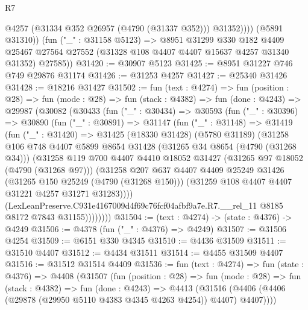 \begin{lexlean}{R7}
\begin{coremodule}
                @4257
                (@31334 @352 @26957 (@4790 (@31337 @352)))
                @31352))))
        (@5891 @31310))
      (fun ("_" : @31158 @5123) =>
      @8951
        @31299
        @330
        @182
        @4409
        @25467
        @27564
        @27552
        (@31328 @108 @4407 @4407 @15637 @4257 @31340 @31352)
        @27585))
@31420 := @30907 @5123
@31425 := @8951 @31227 @746 @749 @29876 @31174
@31426 := @31253 @4257
@31427 := @25340 @31426
@31428 := @18216 @31427
@31502 := fun (text : @4274) =>
  fun (position : @28) =>
  fun (mode : @28) =>
  fun (stack : @4382) =>
  fun (done : @4243) =>
  @29987
    (@30082
      (@30433
        (fun ("_" : @30434) =>
        @30593
          (fun ("_" : @30396) =>
          @30890
            (fun ("_" : @30891) =>
            @31147
              (fun ("_" : @31148) =>
              @31419
                (fun ("_" : @31420) =>
                @31425
                  (@18330 @31428)
                  (@5780 @31189)
                  (@31258
                    @106
                    @748
                    @4407
                    @5899
                    @8654
                    @31428
                    (@31265 @34 @8654 (@4790 (@31268 @34)))
                    (@31258
                      @119
                      @700
                      @4407
                      @4410
                      @18052
                      @31427
                      (@31265 @97 @18052 (@4790 (@31268 @97)))
                      (@31258
                        @207
                        @637
                        @4407
                        @4409
                        @25249
                        @31426
                        (@31265 @150 @25249 (@4790 (@31268 @150)))
                        (@31259 @108 @4407 @4407 @31221 @4257 @31271 @31283))))
                  (LexLeanPreserve.C931e4167009d4f69c76fcf04afbf9a7e.R7.__rel_11
                    @8185
                    @8172
                    @7843
                    @31155))))))))
@31504 := (text : @4274) -> (state : @4376) -> @4249
@31506 := @4378 (fun ("_" : @4376) => @4249)
@31507 := @31506 @4254
@31509 := @6151 @330 @4345
@31510 := @4436 @31509
@31511 := @31510 @4407
@31512 := @4434 @31511
@31514 := @4455 @31509 @4407
@31516 := @31512 @31514 @4409
@31536 := fun (text : @4274) =>
  fun (state : @4376) =>
  @4408
    (@31507
      (fun (position : @28) =>
      fun (mode : @28) =>
      fun (stack : @4382) =>
      fun (done : @4243) =>
      @4413 (@31516 (@4406 (@4406 (@29878 (@29950 @5110 @4383 @4345 @4263 @4254)) @4407) @4407))))

\end{coremodule}
\end{lexlean}
